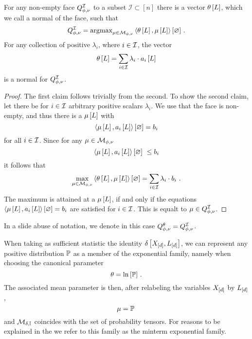 \begin{theorem}\label{the:faceNormal}
	For any non-empty face $Q^{\mathcal{I}}_{\phi,\nu}$ to a subset $\mathcal{I}\subset[n]$ there is a vector $\theta\left[L\right]$, which we call a normal of the face, such that
		\[ Q^{\mathcal{I}}_{\phi,\nu} = \mathrm{argmax}_{\mu\in\mathcal{M}_{\phi,\nu}} \left\langle \theta\left[L\right],\mu\left[L\right]\right\rangle \left[ \varnothing \right]  \, . \]
	For any collection of positive $\lambda_i$, where $i\in\mathcal{I}$, the vector
		\[ \theta\left[L\right] = \sum_{i\in\mathcal{I}} \lambda_i\cdot a_{i}\left[L\right]\]
	is a normal for $Q^{\mathcal{I}}_{\phi,\nu}$.		
\end{theorem}
\begin{proof}
	The first claim follows trivially from the second.
	To show the second claim, let there be for $i\in\mathcal{I}$ arbitrary positive scalars $\lambda_i$.
	We use that the face is non-empty, and thus there is a $\mu\left[L\right]$ with
		\[ \left\langle \mu\left[L\right],a_{i}\left[L\right]\right\rangle \left[ \varnothing \right]=b_{i} \]
	for all $i\in\mathcal{I}$.
	Since for any $\mu\in\mathcal{M}_{\phi,\nu}$ 
		\[ \contraction{\meanparamat{\selvariable},\normalvecofat{i}{\selvariable}} \leq \normalboundof{i} \]
	it follows that
		\[ \max_{\mu\in\mathcal{M}_{\phi,\nu}} \left\langle \theta\left[L\right],\mu\left[L\right]\right\rangle \left[ \varnothing \right] 
		= \sum_{i\in\mathcal{I}} \lambda_i \cdot b_{i} \, \, . \]
	The maximum is attained at a $\mu\left[L\right]$, if and only if the equations $\left\langle \mu\left[L\right],a_{i}\left[L\right]\right\rangle \left[ \varnothing \right]=b_{i}$ are satisfied for $i\in\mathcal{I}$.
	This is equalt to $\mu\in Q^{\mathcal{I}}_{\phi,\nu}$.
\end{proof}

In a slide abuse of notation, we denote in this case $Q^{\theta}_{\phi,\nu} = Q^{\mathcal{I}}_{\phi,\nu}$.





\begin{example}\label{exa:mintermExpFamily}
	When taking as sufficient statistic the identity $\delta\left[X_{[d]},L_{[d]}\right]$, we can represent any positive distribution $\mathbb{P}$ as a member of the exponential family, namely when choosing the canonical parameter
		\[ \theta = \ln \left[ \mathbb{P} \right] \, . \]
	The associated mean parameter is then, after relabeling the variables $X_{[d]}$ by $L_{[d]}$,
		\[ \mu = \mathbb{P} \,  \]
	and $\mathcal{M}_{\delta,\mathbb{I}}$ coincides with the set of probability tensors.
	For reasons to be explained in the  we refer to this family as the minterm exponential family.
\end{example}


